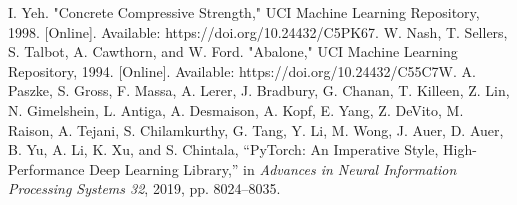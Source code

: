 \documentclass[conference]{IEEEtran}
\begin{document}
\begin{thebibliography}{00}
		 I. Yeh. "Concrete Compressive Strength," UCI Machine Learning Repository, 1998. [Online]. Available: https://doi.org/10.24432/C5PK67.
		 W. Nash, T. Sellers, S. Talbot, A. Cawthorn, and W. Ford. "Abalone," UCI Machine Learning Repository, 1994. [Online]. Available: https://doi.org/10.24432/C55C7W.
			A. Paszke, S. Gross, F. Massa, A. Lerer, J. Bradbury, G. Chanan, T. Killeen, Z. Lin, N. Gimelshein, L. Antiga, A. Desmaison, A. Kopf, E. Yang, Z. DeVito, M. Raison, A. Tejani, S. Chilamkurthy, G. Tang, Y. Li, M. Wong, J. Auer, D. Auer, B. Yu, A. Li, K. Xu, and S. Chintala, ``PyTorch: An Imperative Style, High-Performance Deep Learning Library,'' in \textit{Advances in Neural Information Processing Systems 32}, 2019, pp. 8024--8035.
	\end{thebibliography}
	
\end{document}

